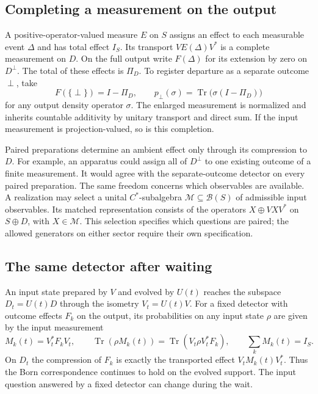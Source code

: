 \documentclass[11pt]{article}
\theoremstyle{definition}
\DeclareMathOperator{\Tr}{Tr}
\begin{document}
\subsection{Completing a measurement on the output}

A positive-operator-valued measure $E$ on $S$ assigns an effect to each measurable event $\Delta$ and has total effect $I_S$. Its transport $VE(\Delta)V^*$ is a complete measurement on $D$. On the full output write $F(\Delta)$ for its extension by zero on $D^\perp$. The total of these effects is $\Pi_D$. To register departure as a separate outcome $\perp$, take
\begin{equation}
 F(\{\perp\})=I-\Pi_D,\qquad
 p_\perp(\sigma)=\Tr\bigl(\sigma(I-\Pi_D)\bigr)
 \label{eq:matched-defect-outcome}
\end{equation}
for any output density operator $\sigma$. The enlarged measurement is normalized and inherits countable additivity by unitary transport and direct sum. If the input measurement is projection-valued, so is this completion.

Paired preparations determine an ambient effect only through its compression to $D$. For example, an apparatus could assign all of $D^\perp$ to one existing outcome of a finite measurement. It would agree with the separate-outcome detector on every paired preparation. The same freedom concerns which observables are available. A realization may select a unital $C^*$-subalgebra $\mathcal M\subseteq\mathcal B(S)$ of admissible input observables. Its matched representation consists of the operators $X\oplus VXV^*$ on $S\oplus D$, with $X\in\mathcal M$. This selection specifies which questions are paired; the allowed generators on either sector require their own specification.

\subsection{The same detector after waiting}

An input state prepared by $V$ and evolved by $U(t)$ reaches the subspace $D_t=U(t)D$ through the isometry $V_t=U(t)V$. For a fixed detector with outcome effects $F_k$ on the output, its probabilities on any input state $\rho$ are given by the input measurement
\[
 M_k(t)=V_t^*F_kV_t,\qquad
 \Tr(\rho M_k(t))=\Tr(V_t\rho V_t^*F_k),\qquad \sum_k M_k(t)=I_S .
\]
On $D_t$ the compression of $F_k$ is exactly the transported effect $V_tM_k(t)V_t^*$. Thus the Born correspondence continues to hold on the evolved support. The input question answered by a fixed detector can change during the wait.
\end{document}
